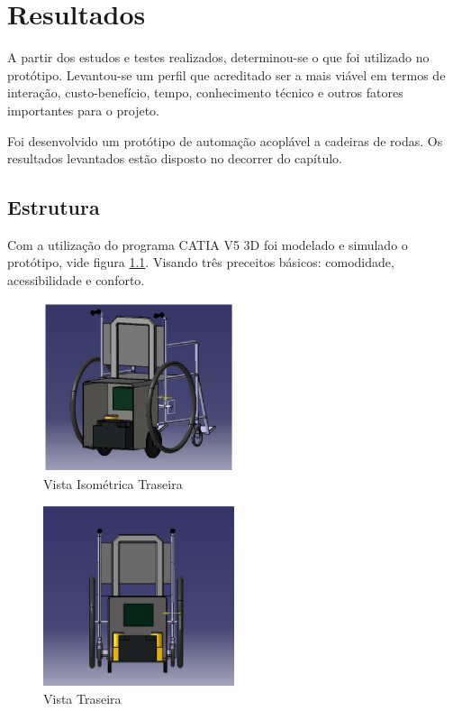 \chapter[Resultados]{Resultados}

A partir dos estudos e testes realizados, determinou-se o que foi utilizado no protótipo. Levantou-se um perfil que acreditado ser a mais viável em termos de interação, custo-benefício, tempo, conhecimento técnico e outros fatores importantes para o projeto.

Foi desenvolvido um protótipo de automação acoplável a cadeiras de rodas. Os resultados levantados estão disposto no decorrer do capítulo.

\section{Estrutura}

Com a utilização do programa CATIA V5 3D foi modelado e simulado o protótipo, vide figura \ref{fig:vista_isometrica_traseira}. Visando três preceitos básicos: comodidade, acessibilidade e conforto.

\begin{figure}[!htb]
\centering
\includegraphics[width=0.5\textwidth]{figuras/estrutura/vista_isometrica_traseira}
\caption{Vista Isométrica Traseira}
\label{fig:vista_isometrica_traseira}
\end{figure}

\begin{figure}[!htb]
\centering
\includegraphics[width=0.5\textwidth]{figuras/estrutura/vista_traseira}
\caption{Vista Traseira}
\label{fig:traseira}
\end{figure}

